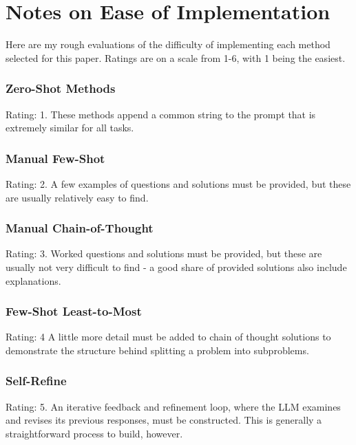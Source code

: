 \documentclass[11pt]{article}
\begin{document}
\clearpage
\newpage

\section{Notes on Ease of Implementation}
\label{sec:difficulty}

Here are my rough evaluations of the difficulty of implementing each method selected for this paper. Ratings are on a scale from 1-6, with 1 being the easiest.

\subsubsection*{Zero-Shot Methods}

Rating: 1. These methods append a common string to the prompt that is extremely similar for all tasks.

\subsubsection*{Manual Few-Shot}

Rating: 2. A few examples of questions and solutions must be provided, but these are usually relatively easy to find.

\subsubsection*{Manual Chain-of-Thought}

Rating: 3. Worked questions and solutions must be provided, but these are usually not very difficult to find - a good share of provided solutions also include explanations.

\subsubsection*{Few-Shot Least-to-Most}

Rating: 4 A little more detail must be added to chain of thought solutions to demonstrate the structure behind splitting a problem into subproblems.

\subsubsection*{Self-Refine}

Rating: 5. An iterative feedback and refinement loop, where the LLM examines and revises its previous responses, must be constructed. This is generally a straightforward process to build, however.
\end{document}
